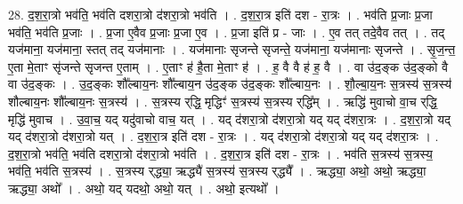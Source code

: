 \documentclass[17pt]{extarticle}
\begin{document}
28. द॒श॒रा॒त्रो भव॑ति॒ भव॑ति दशरा॒त्रो द॑शरा॒त्रो भव॑ति । . द॒श॒रा॒त्र इति॑ दश - रा॒त्रः । . भव॑ति प्र॒जाः प्र॒जा भव॑ति॒ भव॑ति प्र॒जाः । . प्र॒जा ए॒वैव प्र॒जाः प्र॒जा ए॒व । . प्र॒जा इति॑ प्र - जाः । . ए॒व तत् तदे॒वैव तत् । . तद् यज॑माना॒ यज॑माना॒ स्तत् तद् यज॑मानाः । . यज॑मानाः सृजन्ते सृजन्ते॒ यज॑माना॒ यज॑मानाः सृजन्ते । . सृ॒ज॒न्त॒ ए॒ता मे॒ताꣳ सृ॑जन्ते सृजन्त ए॒ताम् । . ए॒ताꣳ ह॑ है॒ता मे॒ताꣳ ह॑ । . ह॒ वै वै ह॑ ह॒ वै । . वा उ॑द॒ङ्क उ॑द॒ङ्को वै वा उ॑द॒ङ्कः । . उ॒द॒ङ्कः शौ᳚ल्बाय॒नः शौ᳚ल्बाय॒न उ॑द॒ङ्क उ॑द॒ङ्कः शौ᳚ल्बाय॒नः । . शौ॒ल्बा॒य॒नः स॒त्रस्य॑ स॒त्रस्य॑ शौल्बाय॒नः शौ᳚ल्बाय॒नः स॒त्रस्य॑ । . स॒त्रस्य र्‌द्धि॒ मृद्धिꣳ॑ स॒त्रस्य॑ स॒त्रस्य र्‌द्धि᳚म् । . ऋद्धि॑ मुवाचो वा॒च र्‌द्धि॒ मृद्धि॑ मुवाच । . उ॒वा॒च॒ यद् यदु॑वाचो वाच॒ यत् । . यद् द॑शरा॒त्रो द॑शरा॒त्रो यद् यद् द॑शरा॒त्रः । . द॒श॒रा॒त्रो यद् यद् द॑शरा॒त्रो द॑शरा॒त्रो यत् । . द॒श॒रा॒त्र इति॑ दश - रा॒त्रः । . यद् द॑शरा॒त्रो द॑शरा॒त्रो यद् यद् द॑शरा॒त्रः । . द॒श॒रा॒त्रो भव॑ति॒ भव॑ति दशरा॒त्रो द॑शरा॒त्रो भव॑ति । . द॒श॒रा॒त्र इति॑ दश - रा॒त्रः । . भव॑ति स॒त्रस्य॑ स॒त्रस्य॒ भव॑ति॒ भव॑ति स॒त्रस्य॑ । . स॒त्रस्य र्‌द्ध्या॒ ऋद्ध्यै॑ स॒त्रस्य॑ स॒त्रस्य र्‌द्ध्यै᳚ । . ऋद्ध्या॒ अथो॒ अथो॒ ऋद्ध्या॒ ऋद्ध्या॒ अथो᳚ । . अथो॒ यद् यदथो॒ अथो॒ यत् । . अथो॒ इत्यथो᳚ । \newline
\end{document}
